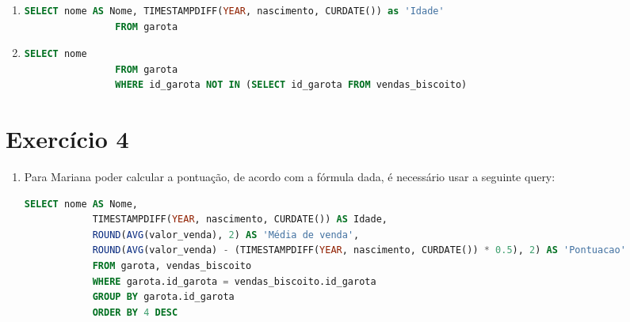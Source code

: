 \documentclass{article}
\begin{document}
\begin{enumerate}[label=\alph*.]
\begin{enumerate}[label=\roman*., labelsep=0.5em, leftmargin=*]
        \item 
        \begin{adjustwidth}{1em}{0pt}
            \begin{lstlisting}[language=SQL]
                SELECT nome AS Nome, TIMESTAMPDIFF(YEAR, nascimento, CURDATE()) as 'Idade'
                FROM garota
            \end{lstlisting}
        \end{adjustwidth}

        \item 
        \begin{adjustwidth}{1em}{0pt}
            \begin{lstlisting}[language=SQL]
                SELECT nome
                FROM garota
                WHERE id_garota NOT IN (SELECT id_garota FROM vendas_biscoito)
            \end{lstlisting}
        \end{adjustwidth}

    \end{enumerate}

\end{enumerate}

\section*{Exercício 4}

\begin{enumerate}[label=\alph*.]

    \item Para Mariana poder calcular a pontuação, de acordo com a fórmula dada, é necessário usar a seguinte query:
    
    \begin{adjustwidth}{1em}{0pt}
        \begin{lstlisting}[language=SQL]
            SELECT nome AS Nome, 
            TIMESTAMPDIFF(YEAR, nascimento, CURDATE()) AS Idade, 
            ROUND(AVG(valor_venda), 2) AS 'Média de venda', 
            ROUND(AVG(valor_venda) - (TIMESTAMPDIFF(YEAR, nascimento, CURDATE()) * 0.5), 2) AS 'Pontuacao'
            FROM garota, vendas_biscoito
            WHERE garota.id_garota = vendas_biscoito.id_garota
            GROUP BY garota.id_garota
            ORDER BY 4 DESC
        \end{lstlisting}
    \end{adjustwidth}

\end{enumerate}
\end{document}
